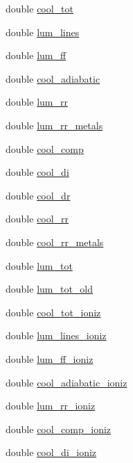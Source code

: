 \begin{DoxyCompactItemize}
double \hyperlink{structplasma_a5f4abbbb9eab15f11e28ab7f26421482}{cool\+\_\+tot}
\item 
double \hyperlink{structplasma_a2c31ecbd91d20cf9f4112db1d6150764}{lum\+\_\+lines}
\item 
double \hyperlink{structplasma_ae9f6828f63719a3dc2f172573293c4a1}{lum\+\_\+ff}
\item 
double \hyperlink{structplasma_acf37090e0b83fe81d058f21229a90018}{cool\+\_\+adiabatic}
\item 
double \hyperlink{structplasma_a7c1a796efafeae5c9aacfbea4e6a79c3}{lum\+\_\+rr}
\item 
double \hyperlink{structplasma_abdee1a55696e7928736435858f69d51f}{lum\+\_\+rr\+\_\+metals}
\item 
double \hyperlink{structplasma_a0af59963361b8b69b3f29c31a303b7c6}{cool\+\_\+comp}
\item 
double \hyperlink{structplasma_a5505637faee8b3d92778c1948e8b0e35}{cool\+\_\+di}
\item 
double \hyperlink{structplasma_a2e449de44ae3c3c3b7fec875b2e55e72}{cool\+\_\+dr}
\item 
double \hyperlink{structplasma_a7bafaea3d058631613ebd1c8a8b8eacc}{cool\+\_\+rr}
\item 
double \hyperlink{structplasma_a59f1e6f2bf27227a52d45f5c5bff07f6}{cool\+\_\+rr\+\_\+metals}
\item 
double \hyperlink{structplasma_a9e5f8826f902ac5154fc3c4c67f404e1}{lum\+\_\+tot}
\item 
double \hyperlink{structplasma_ae0685b14cba52ec98d560c7981e765bf}{lum\+\_\+tot\+\_\+old}
\item 
double \hyperlink{structplasma_ae0379496a0c22546580980cccfabf0c2}{cool\+\_\+tot\+\_\+ioniz}
\item 
double \hyperlink{structplasma_ae8458741703e0a2a71f1b425600b1694}{lum\+\_\+lines\+\_\+ioniz}
\item 
double \hyperlink{structplasma_ab206d43d8bc66c44371da287b69fd5da}{lum\+\_\+ff\+\_\+ioniz}
\item 
double \hyperlink{structplasma_a7030de50e435921b13630ea339eb13e9}{cool\+\_\+adiabatic\+\_\+ioniz}
\item 
double \hyperlink{structplasma_acc048dd6ede76041e2a872cdca2ebb8f}{lum\+\_\+rr\+\_\+ioniz}
\item 
double \hyperlink{structplasma_a90c93c3a8fb77ca113fa5837491fe967}{cool\+\_\+comp\+\_\+ioniz}
\item 
double \hyperlink{structplasma_ae7cfeaf05f9b888e57e0dd66b1d393bc}{cool\+\_\+di\+\_\+ioniz}

\end{DoxyCompactItemize}
